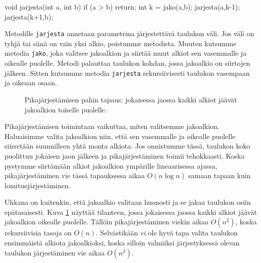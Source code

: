 \begin{code}
void jarjesta(int a, int b) {
    if (a > b) return;
    int k = jako(a,b);
    jarjesta(a,k-1);
    jarjesta(k+1,b);
}
\end{code}

Metodille \texttt{jarjesta} annetaan parametrina järjestettävä
taulukon väli.
Jos väli on tyhjä tai siinä on vain yksi alkio,
poistumme metodista.
Muuten kutsumme metodia \texttt{jako}, joka valitsee jakoalkion
ja siirtää muut alkiot sen vasemmalle ja oikealle puolelle.
Metodi palauttaa taulukon kohdan, jossa jakoalkio on siirtojen jälkeen.
Sitten kutsumme metodia \texttt{jarjesta} rekursiivisesti
taulukon vasempaan ja oikeaan osaan.

\begin{figure}
\center
{}
\caption{Pikajärjestämisen pahin tapaus: jokaisessa jaossa kaikki
alkiot jäävät jakoalkion toiselle puolelle.}
\label{fig:pikpah}
\end{figure}

Pikajärjestämisen toimintaan vaikuttaa, miten valitsemme jakoalkion.
Haluaisimme valita jakoalkion niin, että sen vasemmalle ja oikealle
puolelle siirretään suunnilleen yhtä monta alkiota.
Jos onnistumme tässä, taulukon koko puolittuu jokaisen jaon jälkeen
ja pikajärjestäminen toimii tehokkaasti.
Koska pystymme siirtämään alkiot jakoalkion ympärille
lineaarisessa ajassa, pikajärjestäminen vie tässä tapauksessa aikaa
$O(n \log n)$ samaan tapaan kuin lomitusjärjestäminen.

Uhkana on kuitenkin, että jakoalkio valitaan huonosti ja se jakaa
taulukon osiin epätasaisesti.
Kuva \ref{fig:pikpah} näyttää tilanteen, jossa jokaisessa jaossa
kaikki alkiot jäävät jakoalkion oikealle puolelle.
Tällöin pikajärjestäminen viekin aikaa $O(n^2)$, koska rekursiivisia
tasoja on $O(n)$.
Selvästikään \emph{ei} ole hyvä tapa valita taulukon ensimmäistä
alkiota jakoalkioksi, koska silloin valmiiksi järjestyksessä olevan
taulukon järjestäminen vie aikaa $O(n^2)$.

